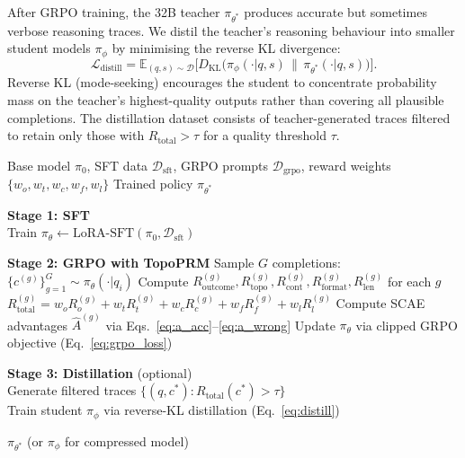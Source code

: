 After GRPO training, the 32B teacher $\pi_{\theta^*}$ produces accurate
but sometimes verbose reasoning traces. We distil the teacher's reasoning
behaviour into smaller student models $\pi_\phi$ by minimising the reverse
KL divergence:
\begin{equation}
\label{eq:distill}
\mathcal{L}_{\mathrm{distill}} = \mathbb{E}_{(q,s) \sim \mathcal{D}}
    \Big[ D_{\mathrm{KL}}\!\big(\pi_\phi(\cdot | q, s)
    \,\|\, \pi_{\theta^*}(\cdot | q, s)\big) \Big].
\end{equation}
Reverse KL (mode-seeking) encourages the student to concentrate
probability mass on the teacher's highest-quality outputs rather than
covering all plausible completions. The distillation dataset consists of
teacher-generated traces filtered to retain only those with
$R_{\mathrm{total}} > \tau$ for a quality threshold $\tau$.

\begin{algorithm}[t]
\caption{TopoPRM Training Pipeline}
\label{alg:topoprm}
\begin{algorithmic}[1]
\REQUIRE Base model $\pi_0$, SFT data $\mathcal{D}_{\mathrm{sft}}$, GRPO prompts $\mathcal{D}_{\mathrm{grpo}}$, reward weights $\{w_o, w_t, w_c, w_f, w_l\}$
\ENSURE Trained policy $\pi_{\theta^*}$

\STATE \textbf{Stage 1: SFT} \\
Train $\pi_\theta \leftarrow \mathrm{LoRA\text{-}SFT}(\pi_0, \mathcal{D}_{\mathrm{sft}})$

\STATE \textbf{Stage 2: GRPO with TopoPRM}
    \STATE Sample $G$ completions: $\{c^{(g)}\}_{g=1}^G \sim \pi_\theta(\cdot | q_i)$
    \STATE Compute $R_{\mathrm{outcome}}^{(g)}, R_{\mathrm{topo}}^{(g)}, R_{\mathrm{cont}}^{(g)}, R_{\mathrm{format}}^{(g)}, R_{\mathrm{len}}^{(g)}$ for each $g$
    \STATE $R_{\mathrm{total}}^{(g)} = w_o R_o^{(g)} + w_t R_t^{(g)} + w_c R_c^{(g)} + w_f R_f^{(g)} + w_l R_l^{(g)}$
    \STATE Compute SCAE advantages $\hat{A}^{(g)}$ via Eqs.~\ref{eq:a_acc}--\ref{eq:a_wrong}
    \STATE Update $\pi_\theta$ via clipped GRPO objective (Eq.~\ref{eq:grpo_loss})
\ENDFOR

\STATE \textbf{Stage 3: Distillation} (optional) \\
Generate filtered traces $\{(q, c^*) : R_{\mathrm{total}}(c^*) > \tau\}$ \\
Train student $\pi_\phi$ via reverse-KL distillation (Eq.~\ref{eq:distill})

\RETURN $\pi_{\theta^*}$ (or $\pi_\phi$ for compressed model)
\end{algorithmic}
\end{algorithm}
